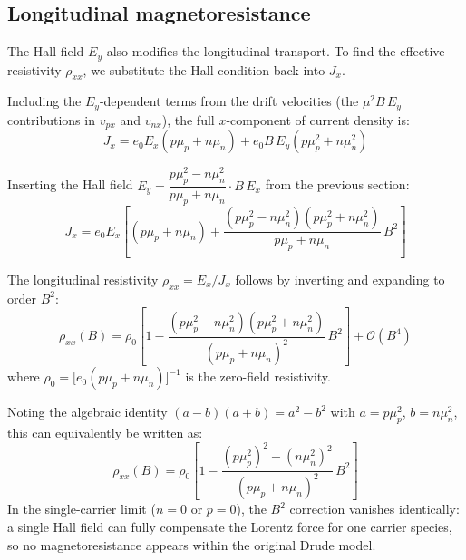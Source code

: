 \documentclass[%
 reprint,
 amsmath,amssymb,
 aps,
]{revtex4-2}
\begin{document}
\subsection{Longitudinal magnetoresistance}

The Hall field $E_y$ also modifies the longitudinal transport. To find the effective resistivity $\rho_{xx}$, we substitute the Hall condition back into $J_x$.

Including the $E_y$-dependent terms from the drift velocities (the $\mu^2 B\, E_y$ contributions in $v_{px}$ and $v_{nx}$), the full $x$-component of current density is:
\begin{equation}
  J_x = e_0 E_x (p\mu_p + n\mu_n) + e_0 B\, E_y (p\mu_p^2 + n\mu_n^2)
\end{equation}

Inserting the Hall field $E_y = \dfrac{p\mu_p^2 - n\mu_n^2}{p\mu_p + n\mu_n} \cdot B\, E_x$ from the previous section:
\begin{equation}
  J_x = e_0 E_x \left[ (p\mu_p + n\mu_n) + \frac{(p\mu_p^2 - n\mu_n^2)(p\mu_p^2 + n\mu_n^2)}{p\mu_p + n\mu_n}\, B^2 \right]
\end{equation}

The longitudinal resistivity $\rho_{xx} = E_x / J_x$ follows by inverting and expanding to order $B^2$:
\begin{equation}
  \rho_{xx}(B) = \rho_0\left[ 1 - \frac{(p\mu_p^2 - n\mu_n^2)(p\mu_p^2 + n\mu_n^2)}{(p\mu_p + n\mu_n)^2}\, B^2 \right] + \mathcal{O}(B^4)
\end{equation}
where $\rho_0 = \bigl[e_0(p\mu_p + n\mu_n)\bigr]^{-1}$ is the zero-field resistivity.

Noting the algebraic identity $(a-b)(a+b) = a^2 - b^2$ with $a = p\mu_p^2$, $b = n\mu_n^2$, this can equivalently be written as:
\begin{equation}
  \rho_{xx}(B) = \rho_0 \left[ 1 - \frac{(p\mu_p^2)^2 - (n\mu_n^2)^2}{(p\mu_p + n\mu_n)^2}\, B^2 \right]
  \label{eq:rho-xx}
\end{equation}
In the single-carrier limit ($n = 0$ or $p = 0$), the $B^2$ correction vanishes identically: a single Hall field can fully compensate the Lorentz force for one carrier species, so no magnetoresistance appears within the original Drude model.


\end{document}
